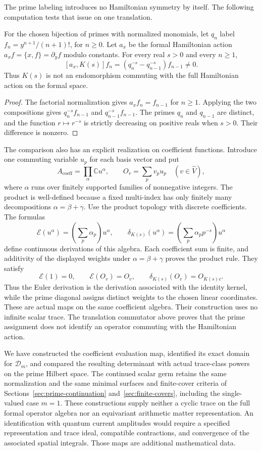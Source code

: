 The prime labeling introduces no Hamiltonian symmetry by itself.
The following computation tests that issue on one translation.

\begin{proposition}
\label{prop:da-translation}
For the chosen bijection of primes with normalized monomials,
let $q_n$ label $f_n=y^{n+1}/(n+1)!$, for $n\geq0$.
Let $a_x$ be the formal Hamiltonian action
$a_x f=\{x,f\}=\partial_y f$ modulo constants.
For every real $s>0$ and every $n\geq1$,
\[
 [a_x,K(s)]f_n
 =(q_n^{-s}-q_{n-1}^{-s})f_{n-1}\ne0.
\]
Thus $K(s)$ is not an endomorphism commuting with the full
Hamiltonian action on the formal space.
\end{proposition}
\begin{proof}
The factorial normalization gives $a_xf_n=f_{n-1}$ for $n\geq1$.
Applying the two compositions gives $q_n^{-s}f_{n-1}$ and
$q_{n-1}^{-s}f_{n-1}$. The primes $q_n$ and $q_{n-1}$ are
distinct, and the function $r\mapsto r^{-s}$ is strictly decreasing
on positive reals when $s>0$. Their difference is nonzero.
\end{proof}

The comparison also has an explicit realization on coefficient functions.
Introduce one commuting variable $u_p$ for each basis vector and put
\[
 A_{\mathrm{coeff}}=\prod_\alpha\mathbb C u^\alpha,
 \qquad O_v=\sum_p v_pu_p\quad(v\in\widehat V),
\]
where $\alpha$ runs over finitely supported families of nonnegative
integers. The product is well-defined because a fixed multi-index has
only finitely many decompositions $\alpha=\beta+\gamma$.
Use the product topology with discrete coefficients. The formulas
\[
 \mathcal E(u^\alpha)=\left(\sum_p\alpha_p\right)u^\alpha,
 \qquad
 \delta_{K(s)}(u^\alpha)=
       \left(\sum_p\alpha_pp^{-s}\right)u^\alpha
\]
define continuous derivations of this algebra. Each coefficient sum is
finite, and additivity of the displayed weights under
$\alpha=\beta+\gamma$ proves the product rule.
They satisfy
\[
 \mathcal E(1)=0,\qquad \mathcal E(O_v)=O_v,
 \qquad \delta_{K(s)}(O_v)=O_{K(s)v}.
\]
Thus the Euler derivation is the derivation associated with the identity
kernel, while the prime diagonal assigns distinct weights to the chosen
linear coordinates. These are actual maps on the same coefficient
algebra. Their construction uses no infinite scalar trace. The
translation commutator above proves that the prime assignment does not
identify an operator commuting with the Hamiltonian action.

We have constructed the coefficient evaluation map, identified its
exact domain for $\mathscr D_m$, and compared the resulting
determinant with actual trace-class powers on the prime Hilbert
space. The continued scalar germ retains the same normalization and
the same minimal surfaces and finite-cover criteria of
Sections~\ref{sec:prime-continuation} and~\ref{sec:finite-covers}, including the single-valued
case $m=1$. These constructions supply neither a cyclic trace on the
full formal operator algebra nor an equivariant arithmetic matter
representation. An identification with quantum current amplitudes
would require a specified representation and trace ideal, compatible
contractions, and convergence of the associated spatial integrals.
Those maps are additional mathematical data.
